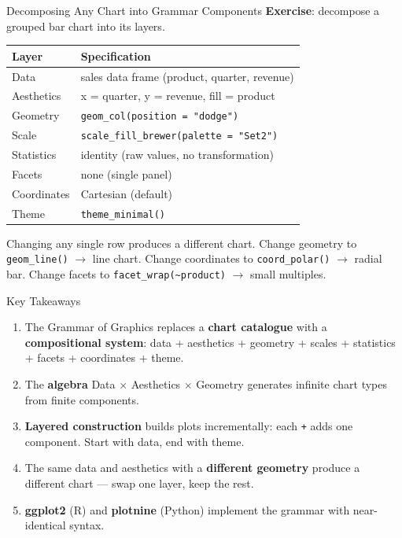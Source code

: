 \documentclass[10pt]{beamer}
\begin{document}
\begin{frame}{Decomposing Any Chart into Grammar Components}
  \textbf{Exercise}: decompose a grouped bar chart into its layers.

  \vspace{4pt}
  \centering
  \begin{tabular}{ll}
    \toprule
    \textbf{Layer} & \textbf{Specification} \\
    \midrule
    Data        & sales data frame (product, quarter, revenue) \\
    Aesthetics  & x = quarter, y = revenue, fill = product \\
    Geometry    & \texttt{geom\_col(position = "dodge")} \\
    Scale       & \texttt{scale\_fill\_brewer(palette = "Set2")} \\
    Statistics  & identity (raw values, no transformation) \\
    Facets      & none (single panel) \\
    Coordinates & Cartesian (default) \\
    Theme       & \texttt{theme\_minimal()} \\
    \bottomrule
  \end{tabular}

  \vspace{6pt}
  {\small Changing any single row produces a different chart. Change
  geometry to \texttt{geom\_line()} $\rightarrow$ line chart. Change
  coordinates to \texttt{coord\_polar()} $\rightarrow$ radial bar.
  Change facets to \texttt{facet\_wrap(\textasciitilde{}product)}
  $\rightarrow$ small multiples.}
\end{frame}

\begin{frame}{Key Takeaways}
  \begin{enumerate}
    \item The Grammar of Graphics replaces a \textbf{chart catalogue}
          with a \textbf{compositional system}: data + aesthetics +
          geometry + scales + statistics + facets + coordinates + theme.
    \item The \textbf{algebra} Data $\times$ Aesthetics $\times$ Geometry
          generates infinite chart types from finite components.
    \item \textbf{Layered construction} builds plots incrementally:
          each \texttt{+} adds one component. Start with data, end with theme.
    \item The same data and aesthetics with a \textbf{different geometry}
          produce a different chart --- swap one layer, keep the rest.
    \item \textbf{ggplot2} (R) and \textbf{plotnine} (Python) implement
          the grammar with near-identical syntax.
  \end{enumerate}
\end{frame}
\end{document}
